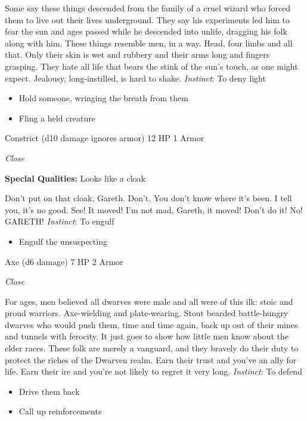 \HRule
Some say these things descended from the family of a cruel wizard who forced them to live out their lives underground. They say his experiments led him to fear the sun and ages passed while he descended into unlife, dragging his folk along with him. These things resemble men, in a way. Head, four limbs and all that. Only their skin is wet and rubbery and their arms long and fingers grasping. They hate all life that bears the stink of the sun's touch, as one might expect. Jealousy, long-instilled, is hard to shake. \emph{Instinct}: To deny light
\begin{itemize}
\item Hold someone, wringing the breath from them
\item Fling a held creature
\end{itemize}

\HRule
{}

Constrict (d10 damage ignores armor)\hspace*{\fill} 12 HP 1 Armor

\emph{Close}

\textbf{Special Qualities:}
Looks like a cloak

\HRule
Don't put on that cloak, Gareth. Don't. You don't know where it's been. I tell you, it's no good. See! It moved! I'm not mad, Gareth, it moved! Don't do it! No! GARETH! \emph{Instinct}: To engulf
\begin{itemize}
\item Engulf the unsuspecting
\end{itemize}
\newpage
\HRule
{}

Axe (d6 damage)\hspace*{\fill} 7 HP 2 Armor

\emph{Close}

\HRule
For ages, men believed all dwarves were male and all were of this ilk: stoic and proud warriors. Axe-wielding and plate-wearing. Stout bearded battle-hungry dwarves who would push them, time and time again, back up out of their mines and tunnels with ferocity. It just goes to show how little men know about the elder races. These folk are merely a vanguard, and they bravely do their duty to protect the riches of the Dwarven realm. Earn their trust and you've an ally for life. Earn their ire and you're not likely to regret it very long. \emph{Instinct}: To defend
\begin{itemize}
\item Drive them back
\item Call up reinforcements
\end{itemize}

